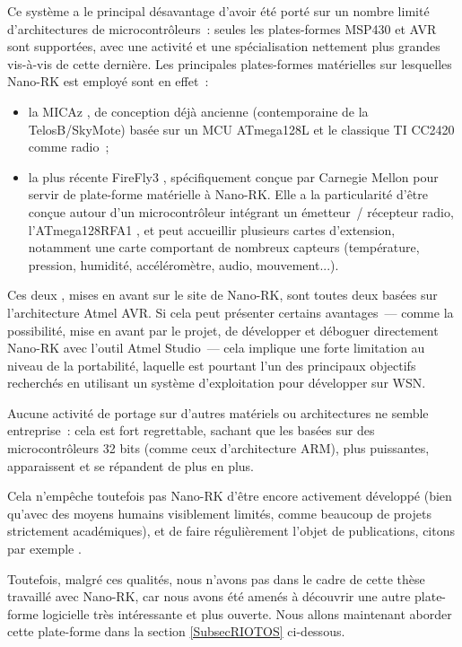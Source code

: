Ce système a le principal désavantage d'avoir été porté sur un nombre limité
d'architectures de microcontrôleurs~: seules les plates-formes MSP430 et AVR
sont supportées, avec une activité et une spécialisation nettement plus
grandes vis-à-vis de cette dernière. Les principales plates-formes
matérielles sur lesquelles Nano-RK est employé sont en effet~:
\begin{itemize}

\item la  MICAz \cite{DSMicaZ}, de conception déjà ancienne
(contemporaine de la TelosB/SkyMote) basée sur un MCU ATmega128L
\cite{DSATmega128L} et le classique TI CC2420 \cite{DSCC2420} comme radio~;

\item la plus récente FireFly3 \cite{FireFly3}, spécifiquement conçue
par Carnegie Mellon pour servir de plate-forme matérielle à Nano-RK.
Elle a la particularité d'être conçue autour d'un microcontrôleur intégrant
un émetteur~/ récepteur radio, l'ATmega128RFA1 \cite{DSATmega128RFA1},
et peut accueillir plusieurs cartes d'extension, notamment une carte
comportant de nombreux capteurs (température, pression, humidité,
accéléromètre, audio, mouvement...).

\end{itemize}

Ces deux , mises en avant sur le site de Nano-RK, sont
toutes deux basées sur l'architecture Atmel AVR. Si cela peut présenter
certains avantages~--- comme la possibilité, mise en avant par le projet,
de développer et déboguer directement Nano-RK avec l'outil Atmel Studio~---
cela implique une forte limitation au niveau de la portabilité, laquelle
est pourtant l'un des principaux objectifs recherchés en utilisant un
système d'exploitation pour développer sur WSN.

Aucune activité de portage sur d'autres matériels ou architectures ne
semble entreprise~: cela est fort regrettable, sachant que les
 basées sur des microcontrôleurs 32 bits (comme ceux
d'architecture ARM), plus puissantes, apparaissent et se répandent
de plus en plus.

Cela n'empêche toutefois pas Nano-RK d'être encore activement développé
(bien qu'avec des moyens humains visiblement limités, comme beaucoup de
projets strictement académiques), et de faire régulièrement l'objet
de publications, citons par exemple \cite{NanoRKHW2013}.

Toutefois, malgré ces qualités, nous n'avons pas dans le cadre de cette
thèse travaillé avec Nano-RK, car nous avons été amenés à découvrir une
autre plate-forme logicielle très intéressante et plus ouverte.
Nous allons maintenant aborder cette plate-forme dans la section
\ref{SubsecRIOTOS} ci-dessous.


